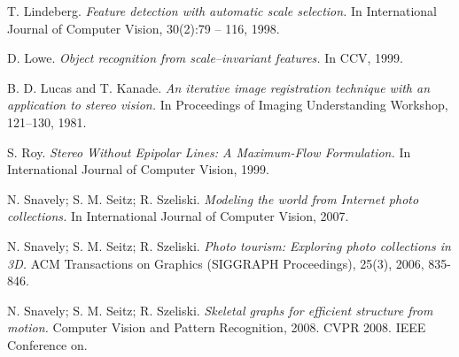 \begin{thebibliography}{99}
  {\sc T. Lindeberg.} 
  \emph{Feature detection with automatic scale selection.}
  In International Journal of Computer Vision, 30(2):79 – 116, 1998.

  {\sc D. Lowe.} 
  \emph{Object recognition from scale–invariant features.}
  In CCV, 1999.


  {\sc B. D. Lucas and T. Kanade. } 
  \emph{An iterative image registration technique with an application to stereo vision.}
  In Proceedings of Imaging Understanding Workshop, 121--130, 1981.

  {\sc S. Roy.} 
  \emph{Stereo Without Epipolar Lines: A Maximum-Flow Formulation.}
  In International Journal of Computer Vision, 1999.

  {\sc N. Snavely; S. M. Seitz; R. Szeliski.} 
  \emph{Modeling the world from Internet photo collections.}
  In International Journal of Computer Vision, 2007.

  {\sc N. Snavely; S. M. Seitz; R. Szeliski.} 
  \emph{Photo tourism: Exploring photo collections in 3D.}
  ACM Transactions on Graphics (SIGGRAPH Proceedings), 25(3), 2006, 835-846.

  {\sc N. Snavely; S. M. Seitz; R. Szeliski.} 
  \emph{Skeletal graphs for efficient structure from motion.}
  Computer Vision and Pattern Recognition, 2008. CVPR 2008. IEEE Conference on.



\end{thebibliography}
